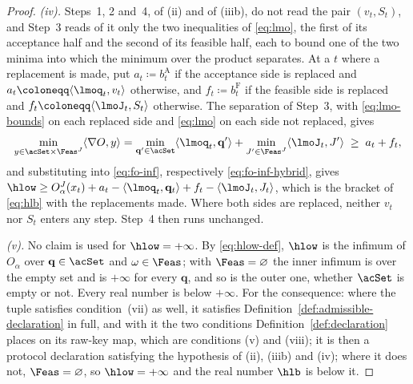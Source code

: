 \begin{proof}
\emph{(iv).} Steps~1, 2 and~4, of (ii) and of (iiib), do not read the pair
$(v_t,S_t)$, and Step~3 reads of it only the two inequalities of
\eqref{eq:lmo}, the first of its acceptance half and the second of its
feasible half, each to bound one of the two minima into which the minimum
over the product separates. At a $t$ where a replacement is made, put
$a_t\coloneqq b^{\mathrm A}_t$ if the acceptance side is replaced and
$a_t\coloneqq\langle\lmoq_t,v_t\rangle$ otherwise, and
$f_t\coloneqq b^{\mathrm F}_t$ if the feasible side is replaced and
$f_t\coloneqq\langle\lmoJ_t,S_t\rangle$ otherwise. The separation of
Step~3, with \eqref{eq:lmo-bounds} on each replaced side and \eqref{eq:lmo}
on each side not replaced, gives
\begin{equation*}
  \min_{y\in\acSet\times\Feas^{J}}\langle\nabla O,y\rangle
  =\min_{\mathbf q'\in\acSet}\langle\lmoq_t,\mathbf q'\rangle
  +\min_{J'\in\Feas^{J}}\langle\lmoJ_t,J'\rangle
  \;\ge\;a_t+f_t ,
\end{equation*}
and substituting into \eqref{eq:fo-inf}, respectively
\eqref{eq:fo-inf-hybrid}, gives
$\hlow\ge O^{J}_{\alpha}(x_t)+a_t-\langle\lmoq_t,\mathbf q_t\rangle
+f_t-\langle\lmoJ_t,J_t\rangle$, which is the bracket of \eqref{eq:hlb}
with the replacements made. Where both sides are replaced, neither $v_t$
nor $S_t$ enters any step. Step~4 then runs unchanged.

\emph{(v).} No claim is used for $\hlow=+\infty$. By \eqref{eq:hlow-def},
$\hlow$ is the infimum of $O_{\alpha}$ over $\mathbf q\in\acSet$ and
$\omega\in\Feas$; with $\Feas=\varnothing$ the inner infimum is over the empty
set and is $+\infty$ for every $\mathbf q$, and so is the outer one, whether
$\acSet$ is empty or not. Every real number is below $+\infty$. For the
consequence: where the tuple satisfies condition~(vii) as well, it
satisfies Definition~\ref{def:admissible-declaration} in full, and with it
the two conditions Definition~\ref{def:declaration} places on its raw-key
map, which are conditions (v) and (viii); it is then a protocol declaration
satisfying the hypothesis of (ii), (iiib) and (iv); where it does not, $\Feas=\varnothing$, so
$\hlow=+\infty$ and the real number $\hlb$ is below it.


\end{proof}
